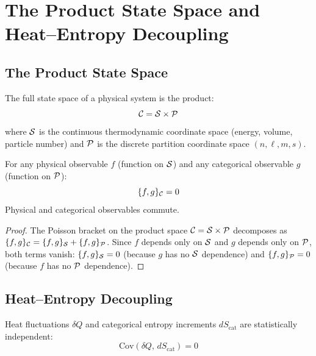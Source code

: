 \section{The Product State Space and Heat--Entropy Decoupling}
\label{sec:decoupling}

\subsection{The Product State Space}

\begin{definition}
\label{def:product_space}
The full state space of a physical system is the product:
\begin{equation}
    \mathcal{C} = \mathcal{S} \times \mathcal{P}
\end{equation}
where $\mathcal{S}$ is the continuous thermodynamic coordinate space (energy, volume, particle number) and $\mathcal{P}$ is the discrete partition coordinate space $(n, \ell, m, s)$.
\end{definition}

\begin{proposition}
\label{prop:poisson}
For any physical observable $f$ (function on $\mathcal{S}$) and any categorical observable $g$ (function on $\mathcal{P}$):
\begin{equation}
    \{f, g\}_{\mathcal{C}} = 0
\end{equation}
Physical and categorical observables commute.
\end{proposition}

\begin{proof}
The Poisson bracket on the product space $\mathcal{C} = \mathcal{S} \times \mathcal{P}$ decomposes as $\{f,g\}_{\mathcal{C}} = \{f,g\}_{\mathcal{S}} + \{f,g\}_{\mathcal{P}}$. Since $f$ depends only on $\mathcal{S}$ and $g$ depends only on $\mathcal{P}$, both terms vanish: $\{f,g\}_{\mathcal{S}} = 0$ (because $g$ has no $\mathcal{S}$ dependence) and $\{f,g\}_{\mathcal{P}} = 0$ (because $f$ has no $\mathcal{P}$ dependence).
\end{proof}

\subsection{Heat--Entropy Decoupling}

\begin{theorem}
\label{thm:decoupling}
Heat fluctuations $\delta Q$ and categorical entropy increments $dS_{\mathrm{cat}}$ are statistically independent:
\begin{equation}
    \mathrm{Cov}(\delta Q, \, dS_{\mathrm{cat}}) = 0
\end{equation}
\end{theorem}

